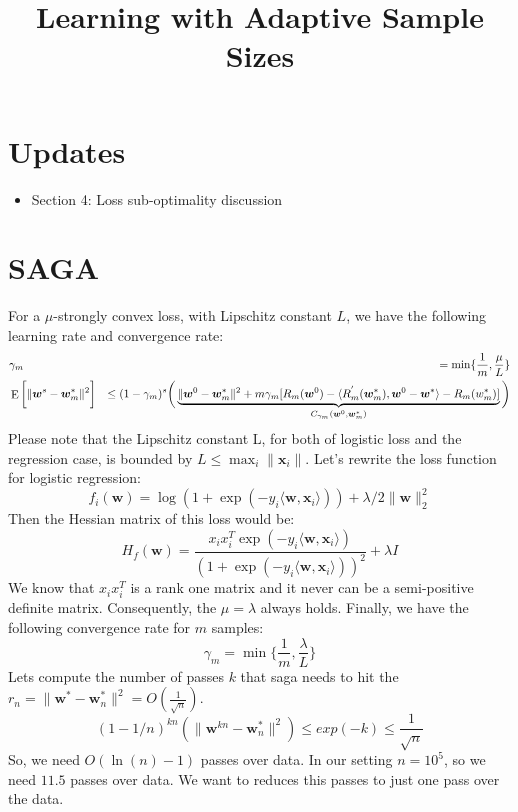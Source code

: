 \documentclass[11pt, a4paper, reqno, twoside]{scrartcl}
\theoremstyle{style}
\DeclareMathOperator*{\E}{\rm E}
\newcommand{\wv}{\bm{w}}
\newcommand{\xv}{\bm{x}}
\newcommand{\0}{\mathbf{0}} %
\begin{document}
\pagestyle{fancy}



\title{Learning with Adaptive Sample Sizes}

\date{} 

\maketitle
\section{Updates}
\begin{itemize}
  \item Section 4: Loss sub-optimality discussion
\end{itemize}

\section{SAGA} 
For a $\mu$-strongly convex loss, with Lipschitz constant $L$, we have the
following learning rate and convergence rate: 
\begin{eqnarray}
& \gamma_m & = \min\{ \frac{1}{m}, \frac{\mu}{L} \} \nonumber\\ 
& \E \bigg[ \| \wv^s -\wv^*_m \|^2 \bigg] & \leq
(1-\gamma_m)^s\bigg(\underbrace{\| \wv^0 -\wv^*_m \|^2 + m\gamma_m [R_m(\wv^0)
- \langle R_m^{'}(\wv^*_m),\wv^0 - \wv^* \rangle - R_m(w^*_m)
]}_{C_{\gamma_m}(\wv^0,\wv^*_m)} \bigg)
\label{eqn:saga_convergence}
\end{eqnarray}
Please note that the Lipschitz constant L, for both of logistic loss and the
regression case, is bounded by $L \leq \max_i \|\xv_i\|$. Let's rewrite the loss
function for logistic regression: 
\begin{equation}
	f_i(\wv) = \log(1+ \exp(-y_i \langle \wv, \xv_i \rangle)) + \lambda/2
	\|\wv\|^2_2
	\nonumber
\end{equation}
Then the Hessian matrix of this loss would be: 
\begin{equation}
	H_f(\wv) = \frac{x_i x_i^T \exp(-y_i \langle \wv, \xv_i \rangle)}{(1+\exp(-y_i
	\langle \wv, \xv_i \rangle))^2} + \lambda I \nonumber
\end{equation}
We know that $x_i x_i^T$ is a rank one matrix and it never can be a
semi-positive definite matrix. Consequently, the $\mu = \lambda$ always holds.
Finally, we have the following convergence rate for $m$ samples: 
\begin{equation}
	\gamma_m  = \min \{ \frac{1}{m}, \frac{\lambda}{L} \}
\end{equation}
Lets compute the number of passes $k$ that saga needs to hit the $r_n = \| \wv^*
- \wv^*_n \|^2 = O(\frac{1}{\sqrt{n}})$. 
\begin{equation}
	(1-1/n)^{k n} (\| \wv^{k n} - \wv^*_n \|^2) \leq exp(-k) \leq
	\frac{1}{\sqrt{n}}
\end{equation}
So, we need $O(\ln(n)-1)$ passes over data. In our setting $n= 10^5$, so we need
$11.5$ passes over data. We want to reduces this passes to just one pass over
the data. 
\end{document}
